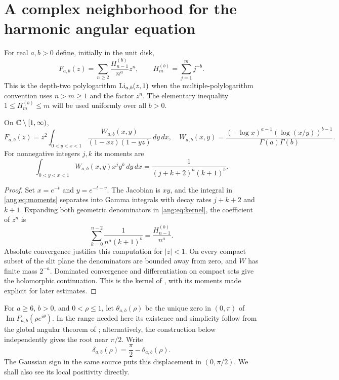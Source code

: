 \section{A complex neighborhood for the harmonic angular equation}
\label{ang:sec:kernel}

For real $a,b>0$ define, initially in the unit disk,
\begin{equation}
 F_{a,b}(z)=\sum_{n\ge2}\frac{H_{n-1}^{(b)}}{n^a}z^n,
 \qquad H_m^{(b)}=\sum_{j=1}^m j^{-b}.
 \label{ang:eq:F}
\end{equation}
This is the depth-two polylogarithm $\operatorname{Li}_{a,b}(z,1)$ when the
multiple-polylogarithm convention uses $n>m\ge1$ and the factor $z^n$.
The elementary inequality $1\le H_m^{(b)}\le m$ will be used
uniformly over all $b>0$.

\begin{lemma}
\label{ang:lem:kernel}
On $\mathbb C\setminus[1,\infty)$,
\begin{equation}
 F_{a,b}(z)=z^2\int_{0<y<x<1}
 \frac{W_{a,b}(x,y)}{(1-xz)(1-yz)}\,dy\,dx,
 \quad
 W_{a,b}(x,y)=
 \frac{(-\log x)^{a-1}(\log(x/y))^{b-1}}{\Gamma(a)\Gamma(b)}.
 \label{ang:eq:kernel}
\end{equation}
For nonnegative integers $j,k$ its moments are
\begin{equation}
 \int_{0<y<x<1}W_{a,b}(x,y)x^jy^k\,dy\,dx
   =\frac1{(j+k+2)^a(k+1)^b}.
 \label{ang:eq:moments}
\end{equation}
\end{lemma}
\begin{proof}
Set $x=e^{-t}$ and $y=e^{-t-v}$. The Jacobian is $xy$, and the
integral in \eqref{ang:eq:moments} separates into Gamma integrals
with decay rates $j+k+2$ and $k+1$. Expanding both geometric
denominators in \eqref{ang:eq:kernel}, the coefficient of $z^n$
is
\[
 \sum_{k=0}^{n-2}\frac1{n^a(k+1)^b}
 =\frac{H_{n-1}^{(b)}}{n^a}.
\]
Absolute convergence justifies this computation for $|z|<1$.
On every compact subset of the slit plane the denominators are bounded
away from zero, and $W$ has finite mass $2^{-a}$. Dominated
convergence and differentiation on compact sets give the holomorphic
continuation. This is the kernel of \cite{RepoThreshold}, with its
moments made explicit for later estimates.
\end{proof}

For $a\ge6$, $b>0$, and $0<\rho\le1$, let $\theta_{a,b}(\rho)$ be the unique zero
in $(0,\pi)$ of $\operatorname{Im}F_{a,b}(\rho e^{i\theta})$.
In the range needed here its existence and simplicity follow from
the global angular theorem of \cite{RepoThreshold}; alternatively,
the construction below independently gives the root near $\pi/2$.
Write
\[
 \delta_{a,b}(\rho)=\frac\pi2-\theta_{a,b}(\rho).
\]
The Gaussian sign in the same source puts this displacement in
$(0,\pi/2)$. We shall also see its local positivity directly.

